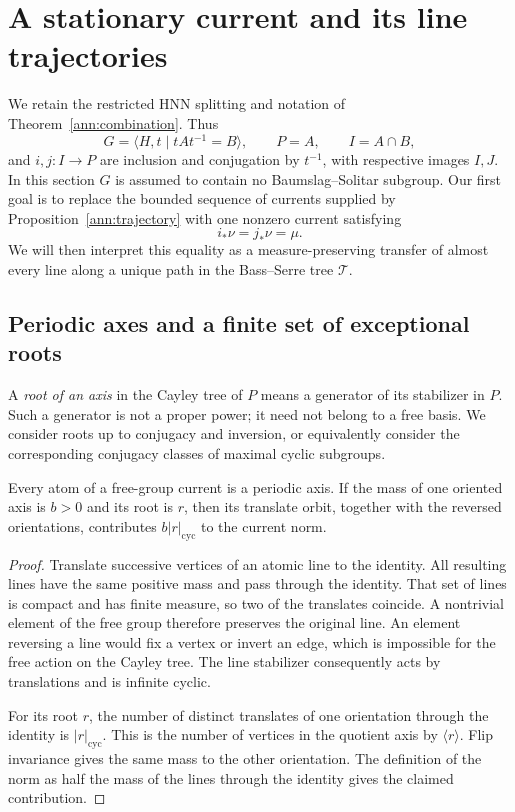 \section{A stationary current and its line trajectories}
\label{stat:section}

We retain the restricted HNN splitting and notation of
Theorem~\ref{ann:combination}.  Thus
\[
 G=\langle H,t\mid tAt^{-1}=B\rangle,\qquad P=A,
 \qquad I=A\cap B,
\]
and $i,j:I\longrightarrow P$ are inclusion and conjugation by $t^{-1}$,
with respective images $I,J$.  In this section $G$ is assumed to contain
no Baumslag--Solitar subgroup.  Our first goal is to replace the bounded
sequence of currents supplied by Proposition~\ref{ann:trajectory} with
one nonzero current satisfying
\[
                    i_*\nu=j_*\nu=\mu.
\]
We will then interpret this equality as a measure-preserving transfer
of almost every line along a unique path in the Bass--Serre tree
$\mathcal T$.

\subsection{Periodic axes and a finite set of exceptional roots}

A \emph{root of an axis} in the Cayley tree of $P$ means a generator of
its stabilizer in $P$.  Such a generator is not a proper power; it need
not belong to a free basis.  We consider roots up to conjugacy and
inversion, or equivalently consider the corresponding conjugacy
classes of maximal cyclic subgroups.

\begin{lemma}\label{stat:atomic-axis}
Every atom of a free-group current is a periodic axis.  If the mass of
one oriented axis is $b>0$ and its root is $r$, then its translate orbit,
together with the reversed orientations, contributes
$b|r|_{\mathrm{cyc}}$ to the current norm.
\end{lemma}
\begin{proof}
Translate successive vertices of an atomic line to the identity.  All
resulting lines have the same positive mass and pass through the
identity.  That set of lines is compact and has finite measure, so two
of the translates coincide.  A nontrivial element of the free group
therefore preserves the original line.  An element reversing a line
would fix a vertex or invert an edge, which is impossible for the free
action on the Cayley tree.  The line stabilizer consequently acts by
translations and is infinite cyclic.

For its root $r$, the number of distinct translates of one orientation
through the identity is $|r|_{\mathrm{cyc}}$.  This is the number of
vertices in the quotient axis by $\langle r\rangle$.  Flip invariance
gives the same mass to the other orientation.  The definition of the
norm as half the mass of the lines through the identity gives the
claimed contribution.
\end{proof}

